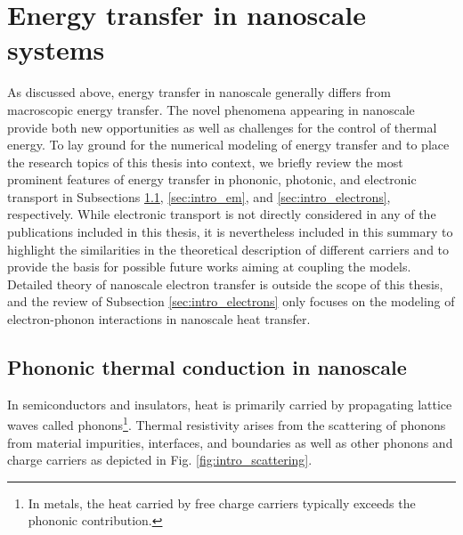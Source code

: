 \section{Energy transfer in nanoscale systems}

As discussed above, energy transfer in nanoscale generally differs from macroscopic energy transfer. The novel phenomena appearing in nanoscale provide both new opportunities as well as challenges for the control of thermal energy. To lay ground for the numerical modeling of energy transfer and to place the research topics of this thesis into context, we briefly review the most prominent features of energy transfer in phononic, photonic, and electronic transport in Subsections \ref{sec:intro_vib}, \ref{sec:intro_em}, and \ref{sec:intro_electrons}, respectively. While electronic transport is not directly considered in any of the publications included in this thesis, it is nevertheless included in this summary to highlight the similarities in the theoretical description of different carriers and to provide the basis for possible future works aiming at coupling the models. Detailed theory of nanoscale electron transfer is outside the scope of this thesis, and the review of Subsection \ref{sec:intro_electrons} only focuses on the modeling of electron-phonon interactions in nanoscale heat transfer. 

\subsection{Phononic thermal conduction in nanoscale}
\label{sec:intro_vib}

In semiconductors and insulators, heat is primarily carried by propagating lattice waves called phonons\footnote{In metals, the heat carried by free charge carriers typically exceeds the phononic contribution.}. Thermal resistivity arises from the scattering of phonons from material impurities, interfaces, and boundaries as well as other phonons and charge carriers \cite{peierls29,ziman} as depicted in Fig. \ref{fig:intro_scattering}. 


